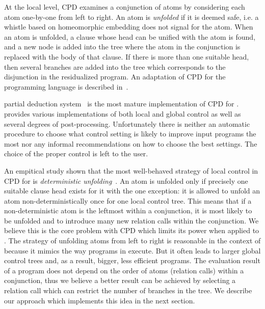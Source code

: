 At the local level, CPD examines a conjunction of atoms by considering each atom one-by-one from left to right.
An atom is \emph{unfolded} if it is deemed safe, i.e. a whistle based on homeomorphic embedding does not signal for the atom.
When an atom is unfolded, a clause whose head can be unified with the atom is found, and a new node is added into the tree where the atom in the conjunction is replaced with the body of that clause.
If there is more than one suitable head, then several branches are added into the tree which corresponds to the disjunction in the residualized program.
An adaptation of CPD for the \mk programming language is described in~\cite{lozov2019relational}.

\ecce partial deduction system~\cite{leuschel1997ecce} is the most mature implementation of CPD for \pro.
\ecce provides various implementations of both local and global control as well as several degrees of post-processing.
Unfortunately there is neither an automatic procedure to choose what control setting is likely to improve input programs the most nor any informal recommendations on how to choose the best settings.
The choice of the proper control is left to the user.

An empitical study shown that the most well-behaved strategy of local control in CPD for \pro is \emph{deterministic unfolding}~\cite{leuschel1997advanced}.
An atom is unfolded only if precisely one suitable clause head exists for it with the one exception: it is allowed to unfold an atom non-deterministically once for one local control tree.
This means that if a non-deterministic atom is the leftmost within a conjunction, it is most likely to be unfolded and to introduce many new relation calls within the conjunction.
We believe this is the core problem with CPD which limits its power when applied to \mk.
The strategy of unfolding atoms from left to right is reasonable in the context of \pro because it mimics the way programs in \pro execute.
But it often leads to larger global control trees and, as a result, bigger, less efficient programs.
The evaluation result of a \mk program does not depend on the order of atoms (relation calls) within a conjunction, thus we believe a better result can be achieved by selecting a relation call which can restrict the number of branches in the tree.
We describe our approach which implements this idea in the next section.
